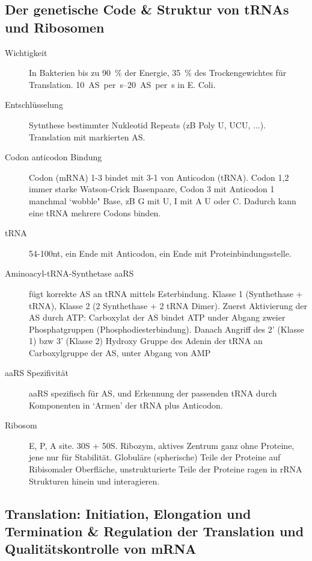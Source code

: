 \documentclass[a4paper,twocolumn,usegeometry,english,fontsize=5,DIV=28]{scrartcl}
\begin{document}
\subsection{Der genetische Code \& Struktur von tRNAs und Ribosomen}

\begin{description}
	\item[Wichtigkeit] In Bakterien bis zu \SI{90}{\percent} der Energie,
		\SI{35}{\percent} des Trockengewichtes für Translation.
		\SIrange{10}{20}{AS per s} in E. Coli.
	\item[Entschlüsselung] Sytnthese bestimmter Nukleotid Repeats (zB Poly
		U, UCU, ...).  Translation mit markierten AS.
	\item[Codon anticodon Bindung] Codon (mRNA) 1-3 bindet mit 3-1 von
		Anticodon (tRNA). Codon 1,2 immer starke Watson-Crick
		Basenpaare, Codon 3 mit Anticodon 1 manchmal `wobble" Base, zB
		G mit U, I mit A U oder C. Dadurch kann eine tRNA mehrere
		Codons binden.
	\item[tRNA] 54-100nt, ein Ende mit Anticodon, ein Ende mit
		Proteinbindungsstelle.
	\item[Aminoacyl-tRNA-Synthetase aaRS] fügt korrekte AS an tRNA mittels
		Esterbindung. Klasse 1 (Synthethase + tRNA), Klasse 2 (2
		Synthethase + 2 tRNA Dimer). Zuerst Aktivierung der AS durch
		ATP: Carboxylat der AS bindet ATP under Abgang zweier
		Phosphatgruppen (Phosphodiesterbindung). Danach Angriff des 2'
		(Klasse 1) bzw 3' (Klasse 2) Hydroxy Gruppe des Adenin der tRNA
		an Carboxylgruppe der AS, unter Abgang von AMP
	\item[aaRS Spezifivität] aaRS spezifisch für AS, und Erkennung der
		passenden tRNA durch Komponenten in `Armen' der tRNA plus
		Anticodon.
	\item[Ribosom] E, P, A site. 30S + 50S. Ribozym, aktives Zentrum ganz
		ohne Proteine, jene nur für Stabilität. Globuläre (spherische)
		Teile der Proteine auf Ribisomaler Oberfläche, unstrukturierte
		Teile der Proteine ragen in rRNA Strukturen hinein und
		interagieren.
\end{description}

\subsection{Translation: Initiation, Elongation und Termination \& Regulation
der Translation und Qualitätskontrolle von mRNA}
\end{document}
